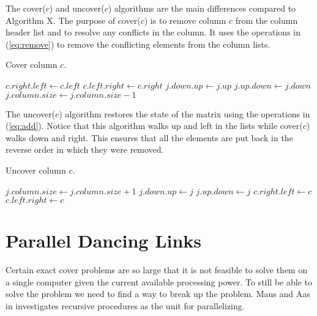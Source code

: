 The cover($c$) and uncover($c$) algorithms are the main differences compared to Algorithm X.
The purpose of cover($c$) is to remove column $c$ from the column header list and to resolve any conflicts in the column.
It uses the operations in (\ref{eq:remove}) to remove the conflicting elements from the column lists.
\begin{algorithm}[H]
	\caption{Cover column $c$.}
	\label{dlx_cover}
	\begin{distribalgo}[1]
			\STATE $c.right.left \leftarrow c.left$
			\STATE $c.left.right \leftarrow c.right$
					\STATE $j.down.up \leftarrow j.up$
					\STATE $j.up.down \leftarrow j.down$
					\STATE $j.column.size \leftarrow j.column.size - 1$
				\ENDFOR
			\ENDFOR
		\ENDPROC
	\end{distribalgo}
\end{algorithm}

The uncover($c$) algorithm restores the state of the matrix using the operations in (\ref{eq:add}).
Notice that this algorithm walks up and left in the lists while cover($c$) walks down and right.
This ensures that all the elements are put back in the reverse order in which they were removed.
\begin{algorithm}[H]
	\caption{Uncover column $c$.}
	\label{dlx_uncover}
	\begin{distribalgo}[1]
					\STATE $j.column.size \leftarrow j.column.size + 1$
					\STATE $j.down.up \leftarrow j$
					\STATE $j.up.down \leftarrow j$
				\ENDFOR
			\ENDFOR
			\STATE $c.right.left \leftarrow c$
			\STATE $c.left.right \leftarrow c$
		\ENDPROC
	\end{distribalgo}
\end{algorithm}



\section{Parallel Dancing Links}

Certain exact cover problems are so large that it is not feasible to solve them on a single computer given the current available processing power.
To still be able to solve the problem we need to find a way to break up the problem.
Maus and Aas in \cite{maus-prp} investigates recursive procedures as the unit for parallelizing.


